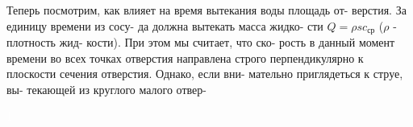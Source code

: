 \begin{minipage}[t]{0.44\textwidth}
    Теперь посмотрим, как влияет на\linebreak
    время вытекания воды площадь от-\linebreak
    верстия. За единицу времени из сосу-\linebreak
    да должна вытекать масса жидко-\linebreak
    сти $Q=\rho sc_{ср}$ ($\rho$ - плотность жид-\linebreak
    кости). При этом мы считает, что ско-\linebreak
    рость в данный момент времени во\linebreak
    всех точках отверстия направлена\linebreak
    строго перпендикулярно к плоскости\linebreak
    сечения отверстия. Однако, если вни-\linebreak
    мательно приглядеться к струе, вы-\linebreak
    текающей из круглого малого отвер-\linebreak
\end{minipage}
\begin{minipage}[b]{0.02\textwidth} 
\center
\textcolor{white}{\hbox{1}} 
\end{minipage}
